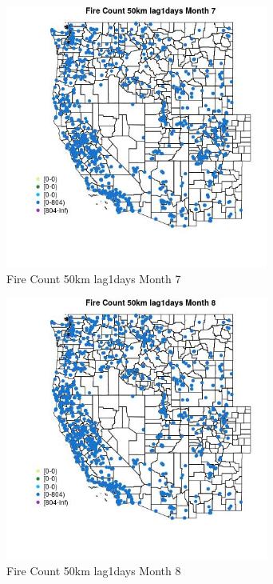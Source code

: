 \begin{figure} 
\centering  
\includegraphics[width=0.77\textwidth]{Code_Outputs/Report_ML_input_PM25_Step4_part_f_de_duplicated_aveswNAs_MapObsMo7Fire_Count_50km_lag1days.jpg} 
\caption{\label{fig:Report_ML_input_PM25_Step4_part_f_de_duplicated_aveswNAsMapObsMo7Fire_Count_50km_lag1days}Fire Count 50km lag1days Month 7} 
\end{figure} 
 

\clearpage 

\begin{figure} 
\centering  
\includegraphics[width=0.77\textwidth]{Code_Outputs/Report_ML_input_PM25_Step4_part_f_de_duplicated_aveswNAs_MapObsMo8Fire_Count_50km_lag1days.jpg} 
\caption{\label{fig:Report_ML_input_PM25_Step4_part_f_de_duplicated_aveswNAsMapObsMo8Fire_Count_50km_lag1days}Fire Count 50km lag1days Month 8} 
\end{figure} 
 

